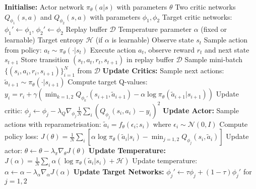 \begin{algorithmic}
\State \textbf{Initialise:}
\State \quad Actor network $\pi_\theta(a|s)$ with parameters $\theta$
\State \quad Two critic networks $Q_{\phi_1}(s,a)$ and $Q_{\phi_2}(s,a)$ with parameters $\phi_1, \phi_2$
\State \quad Target critic networks: $\phi_1' \leftarrow \phi_1$, $\phi_2' \leftarrow \phi_2$
\State \quad Replay buffer $\mathcal{D}$
\State \quad Temperature parameter $\alpha$ (fixed or learnable)
\State \quad Target entropy $\mathcal{H}$ (if $\alpha$ is learnable)
\State
{}
    \State Observe state $s_t$
    \State Sample action from policy: $a_t \sim \pi_\theta(\cdot | s_t)$
    \State Execute action $a_t$, observe reward $r_t$ and next state $s_{t+1}$
    \State Store transition $(s_t, a_t, r_t, s_{t+1})$ in replay buffer $\mathcal{D}$
    \State
        \State Sample mini-batch $\{(s_i, a_i, r_i, s_{i+1})\}_{i=1}^N$ from $\mathcal{D}$
        \State
        \State \textbf{Update Critics:}
            \State Sample next actions: $\tilde{a}_{i+1} \sim \pi_\theta(\cdot | s_{i+1})$
            \State Compute target Q-values:
            \State \quad $y_i = r_i + \gamma \left(\min_{k=1,2} Q_{\phi_k'}(s_{i+1}, \tilde{a}_{i+1}) - \alpha \log \pi_\theta(\tilde{a}_{i+1} | s_{i+1})\right)$
            \State Update critic: $\phi_j \leftarrow \phi_j - \lambda_Q \nabla_{\phi_j} \frac{1}{N}\sum_i (Q_{\phi_j}(s_i, a_i) - y_i)^2$
        \EndFor
        \State
        \State \textbf{Update Actor:}
        \State Sample actions with reparametrisation: $\tilde{a}_i = f_\theta(\epsilon_i; s_i)$ where $\epsilon_i \sim \mathcal{N}(0, I)$
        \State Compute policy loss:
        \State \quad $J(\theta) = \frac{1}{N}\sum_i \left[\alpha \log \pi_\theta(\tilde{a}_i | s_i) - \min_{j=1,2} Q_{\phi_j}(s_i, \tilde{a}_i)\right]$
        \State Update actor: $\theta \leftarrow \theta - \lambda_\pi \nabla_\theta J(\theta)$
        \State
            \State \textbf{Update Temperature:}
            \State $J(\alpha) = \frac{1}{N}\sum_i \alpha \left(\log \pi_\theta(\tilde{a}_i | s_i) + \mathcal{H}\right)$
            \State Update temperature: $\alpha \leftarrow \alpha - \lambda_\alpha \nabla_\alpha J(\alpha)$
        \EndIf
        \State
        \State \textbf{Update Target Networks:}
        \State $\phi_j' \leftarrow \tau \phi_j + (1-\tau) \phi_j'$ for $j = 1, 2$
    \EndIf
\EndFor
\end{algorithmic}